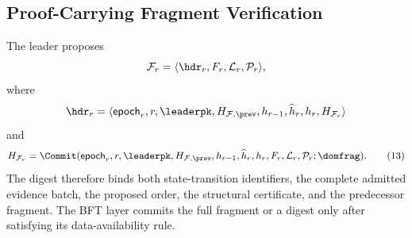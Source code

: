 \subsection{Proof-Carrying Fragment Verification}
\label{sec:proof-carrying-verification-v4}

The leader proposes
\[
 \mathcal F_r=\langle\hdr_r,F_r,\mathcal L_r,\mathcal P_r\rangle,
\]
where
\[
 \hdr_r=\langle\mathsf{epoch}_r,r,\leaderpk,H_{\mathcal F,\prev},
 h_{r-1},\widehat h_r,h_r,H_{\mathcal F_r}\rangle
\]
and
\[
 H_{\mathcal F_r}=\Commit(\mathsf{epoch}_r,r,\leaderpk,
 H_{\mathcal F,\prev},h_{r-1},\widehat h_r,h_r,
 F_r,\mathcal L_r,\mathcal P_r;\domfrag).
 \tag{13}\label{eq:fragment-v4}
\]
The digest therefore binds both state-transition identifiers, the complete
admitted evidence batch, the proposed order, the structural certificate, and
the predecessor fragment.  The BFT layer commits the full fragment or a
digest only after satisfying its data-availability rule.

